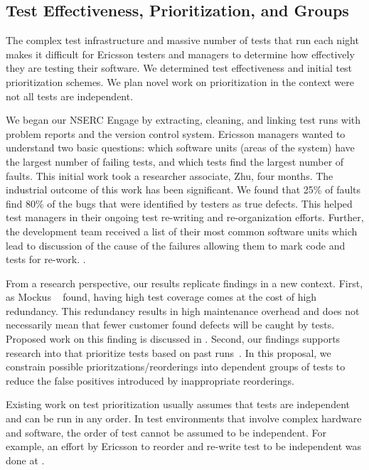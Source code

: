 \subsection{Test Effectiveness, Prioritization, and Groups}

The complex test infrastructure and massive number of tests that run each night makes it difficult for Ericsson testers and managers to determine how effectively they are testing their software. We determined test effectiveness and initial test prioritization schemes. We plan novel work on prioritization in the context were not all tests are independent.

We began our NSERC Engage by extracting, cleaning, and linking test runs with problem reports and the version control system. Ericsson managers wanted to understand two basic questions: which software units (areas of the system) have the largest number of failing tests, and which tests find the largest number of faults. 
%
This initial work took a researcher associate, Zhu, four months. The industrial outcome of this work has been significant. We found that 25\% of faults find 80\% of the bugs that were identified by testers as true defects. 
%
%
This helped test managers in their ongoing test re-writing and re-organization efforts. Further, the development team received a list of their most common software units which lead to discussion of the cause of the failures allowing them to mark code and tests for re-work. . 

From a research perspective, our results replicate findings in a new context. First, as Mockus \etal~\cite{} found, having high test coverage comes at the cost of high redundancy. This redundancy results in high maintenance overhead and does not necessarily mean that fewer customer found defects will be caught by tests. Proposed work on this finding is discussed in . Second, our findings supports research into that prioritize tests based on past runs~\cite{Porter,Recent}. In this proposal, we constrain possible prioritzations/reorderings into dependent groups of tests to reduce the false positives introduced by inappropriate reorderings.

Existing work on test prioritization usually assumes that tests are independent and can be run in any order. In test environments that involve complex hardware and software, the order of test cannot be assumed to be independent. For example, an effort by Ericsson  to reorder and re-write test to be independent was done at . 

